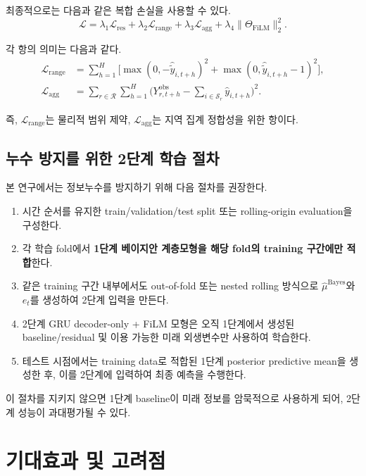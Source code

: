 \documentclass[11pt,a4paper]{article}
\begin{document}
최종적으로는 다음과 같은 복합 손실을 사용할 수 있다.
\begin{equation}
    \mathcal L = \lambda_1 \mathcal L_{\mathrm{res}} + \lambda_2 \mathcal L_{\mathrm{range}} + \lambda_3 \mathcal L_{\mathrm{agg}} + \lambda_4 \lVert \Theta_{\mathrm{FiLM}} \rVert_2^2.
\end{equation}

각 항의 의미는 다음과 같다.
\begin{align}
    \mathcal L_{\mathrm{range}} &= \sum_{h=1}^H \Big[\max(0,-\hat{\tilde y}_{i,t+h})^2 + \max(0,\hat{\tilde y}_{i,t+h}-1)^2\Big], \\
    \mathcal L_{\mathrm{agg}} &= \sum_{r\in\mathcal R}\sum_{h=1}^H \Big(Y^{\mathrm{obs}}_{r,t+h} - \sum_{i\in\mathcal S_r} \hat y_{i,t+h}\Big)^2.
\end{align}

즉, $\mathcal L_{\mathrm{range}}$는 물리적 범위 제약, $\mathcal L_{\mathrm{agg}}$는 지역 집계 정합성을 위한 항이다.

\subsection{누수 방지를 위한 2단계 학습 절차}
본 연구에서는 정보누수를 방지하기 위해 다음 절차를 권장한다.
\begin{enumerate}[label=Step \arabic*., leftmargin=2.5em]
    \item 시간 순서를 유지한 train/validation/test split 또는 rolling-origin evaluation을 구성한다.
    \item 각 학습 fold에서 \textbf{1단계 베이지안 계층모형을 해당 fold의 training 구간에만 적합}한다.
    \item 같은 training 구간 내부에서도 out-of-fold 또는 nested rolling 방식으로 $\hat \mu^{\mathrm{Bayes}}$와 $e_t$를 생성하여 2단계 입력을 만든다.
    \item 2단계 GRU decoder-only + FiLM 모형은 오직 1단계에서 생성된 baseline/residual 및 이용 가능한 미래 외생변수만 사용하여 학습한다.
    \item 테스트 시점에서는 training data로 적합된 1단계 posterior predictive mean을 생성한 후, 이를 2단계에 입력하여 최종 예측을 수행한다.
\end{enumerate}

이 절차를 지키지 않으면 1단계 baseline이 미래 정보를 암묵적으로 사용하게 되어, 2단계 성능이 과대평가될 수 있다.

\section{기대효과 및 고려점}
\end{document}
